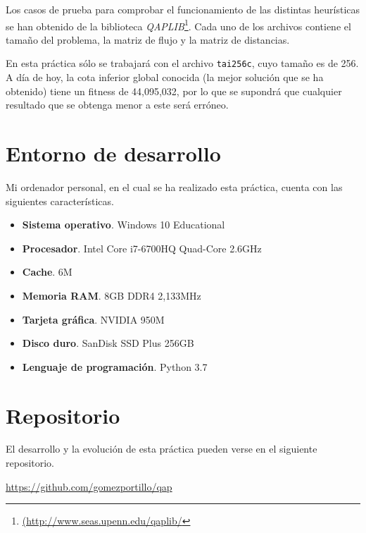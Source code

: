 Los casos de prueba para comprobar el funcionamiento de las distintas heurísticas se han obtenido de la biblioteca \textit{QAPLIB}\footnote{\url{(http://www.seas.upenn.edu/qaplib/}}. Cada uno de los archivos contiene el tamaño del problema, la matriz de flujo y la matriz de distancias.

En esta práctica sólo se trabajará con el archivo \texttt{tai256c}, cuyo tamaño es de 256. A día de hoy, la cota inferior global conocida (la mejor solución que se ha obtenido) tiene un fitness de 44,095,032, por lo que se supondrá que cualquier resultado que se obtenga menor a este será erróneo.


\section{Entorno de desarrollo}

Mi ordenador personal, en el cual se ha realizado esta práctica, cuenta con las siguientes características.

\begin{itemize}
  \item \textbf{Sistema operativo}. Windows 10 Educational
  \item \textbf{Procesador}. Intel Core i7-6700HQ Quad-Core 2.6GHz
  \item \textbf{Cache}. 6M
  \item \textbf{Memoria RAM}. 8GB DDR4 2,133MHz
  \item \textbf{Tarjeta gráfica}. NVIDIA 950M 
  \item \textbf{Disco duro}. SanDisk SSD Plus 256GB
  \item \textbf{Lenguaje de programación}. Python 3.7
\end{itemize}

\section{Repositorio}

El desarrollo y la evolución de esta práctica pueden verse en el siguiente repositorio.

\begin{center}
\url{https://github.com/gomezportillo/qap}
\end{center}